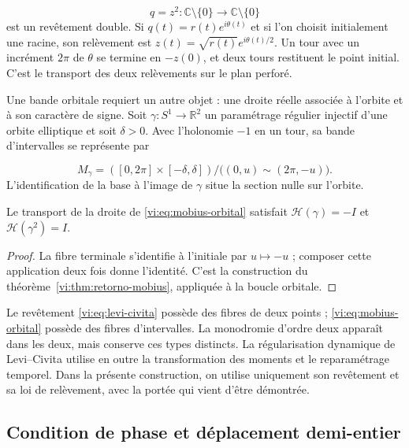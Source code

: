 \begin{equation}
 q=z^2:\mathbb C\setminus\{0\}\longrightarrow
                 \mathbb C\setminus\{0\}
 \label{vi:eq:levi-civita}
\end{equation}
est un revêtement double. Si $q(t)=r(t)e^{i\theta(t)}$ et si l’on
choisit initialement une racine, son relèvement est
$z(t)=\sqrt{r(t)}e^{i\theta(t)/2}$. Un tour avec un incrément
$2\pi$ de $\theta$ se termine en $-z(0)$, et deux tours
restituent le point initial. C’est le transport des deux
relèvements sur le plan perforé.


Une bande orbitale requiert un autre objet : une droite réelle
associée à l’orbite et à son caractère de signe. Soit
$\gamma:S^1\to\mathbb R^2$ un paramétrage régulier
injectif d’une orbite elliptique et soit $\delta>0$. Avec
l’holonomie $-1$ en un tour, sa bande d’intervalles se
représente par

\begin{equation}
 M_\gamma=([0,2\pi]\times[-\delta,\delta])/
          \bigl((0,u)\sim(2\pi,-u)\bigr).
 \label{vi:eq:mobius-orbital}
\end{equation}
L’identification de la base à l’image de $\gamma$
situe la section nulle sur l’orbite.


\begin{proposition}
\label{vi:prop:holonomia-orbital}
Le transport de la droite de \eqref{vi:eq:mobius-orbital}
satisfait
$\mathcal H(\gamma)=-I$ et $\mathcal H(\gamma^2)=I$.

\end{proposition}
\begin{proof}
La fibre terminale s’identifie à l’initiale par
$u\mapsto-u$ ; composer cette application deux fois donne l’identité.
C’est la construction du
théorème~\ref{vi:thm:retorno-mobius}, appliquée à la boucle orbitale.

\end{proof}

Le revêtement \eqref{vi:eq:levi-civita} possède des fibres de deux
points ; \eqref{vi:eq:mobius-orbital} possède des fibres
d’intervalles. La monodromie d’ordre deux apparaît dans les deux,
mais conserve ces types distincts. La régularisation
dynamique de Levi--Civita utilise en outre la transformation
des moments et le reparamétrage temporel. Dans la présente
construction, on utilise uniquement son revêtement et sa loi de
relèvement, avec la portée qui vient d’être démontrée.


\subsection{Condition de phase et déplacement demi-entier
}
\label{vi:subsec:sommerfeld}

